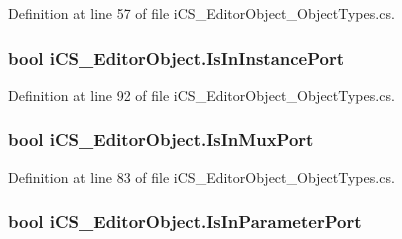 Definition at line 57 of file i\+C\+S\+\_\+\+Editor\+Object\+\_\+\+Object\+Types.\+cs.

\hypertarget{classi_c_s___editor_object_a507e0ee2db1177094f69e7ee05db8dcd}{
\subsubsection[{Is\+In\+Instance\+Port}]{\setlength{\rightskip}{0pt plus 5cm}bool i\+C\+S\+\_\+\+Editor\+Object.\+Is\+In\+Instance\+Port\hspace{0.3cm}{\ttfamily [get]}}}\label{classi_c_s___editor_object_a507e0ee2db1177094f69e7ee05db8dcd}


Definition at line 92 of file i\+C\+S\+\_\+\+Editor\+Object\+\_\+\+Object\+Types.\+cs.

\hypertarget{classi_c_s___editor_object_aa0fe0596710c195bc4f8ec0bc0d9756f}{
\subsubsection[{Is\+In\+Mux\+Port}]{\setlength{\rightskip}{0pt plus 5cm}bool i\+C\+S\+\_\+\+Editor\+Object.\+Is\+In\+Mux\+Port\hspace{0.3cm}{\ttfamily [get]}}}\label{classi_c_s___editor_object_aa0fe0596710c195bc4f8ec0bc0d9756f}


Definition at line 83 of file i\+C\+S\+\_\+\+Editor\+Object\+\_\+\+Object\+Types.\+cs.

\hypertarget{classi_c_s___editor_object_a59e6d9a7b36c4eb1abbda3670a768d0d}{
\subsubsection[{Is\+In\+Parameter\+Port}]{\setlength{\rightskip}{0pt plus 5cm}bool i\+C\+S\+\_\+\+Editor\+Object.\+Is\+In\+Parameter\+Port\hspace{0.3cm}{\ttfamily [get]}}}\label{classi_c_s___editor_object_a59e6d9a7b36c4eb1abbda3670a768d0d}


